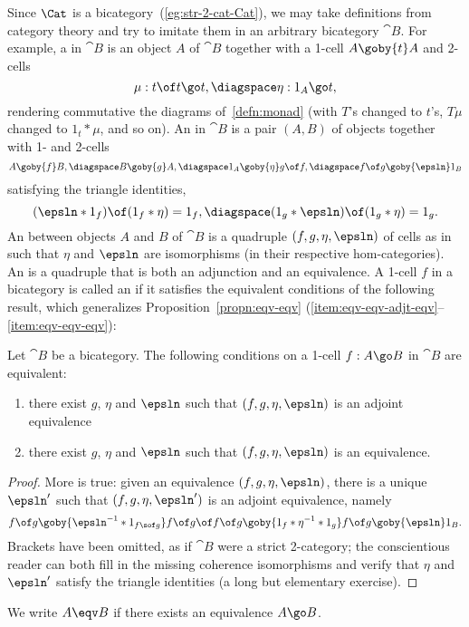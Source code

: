 Since $\Cat$ is a bicategory~(\ref{eg:str-2-cat-Cat}), we may take
definitions from category theory and try to imitate them in an arbitrary
bicategory $\cat{B}$.  For example, a %
%
%
in $\cat{B}$ is an object $A$ of $\cat{B}$ together with a 1-cell $A
\goby{t} A$ and 2-cells
\[
\mu: t \of t \go t, 
\diagspace
\eta: 1_A \go t,
\]
rendering commutative the diagrams of~\ref{defn:monad} (with $T$'s changed
to $t$'s, $T\mu$ changed to $1_t * \mu$, and so on).  An
%
%
%
in $\cat{B}$ is a pair $(A, B)$ of objects together with 1- and 2-cells
% 
\begin{equation}	\label{eq:bicat-adjn-data}
A \goby{f} B,
\diagspace
B \goby{g} A,
\diagspace
1_A \goby{\eta} g \of f,
\diagspace
f\of g \goby{\epsln} 1_B
\end{equation}
% 
satisfying the triangle identities,%
%
%
\[
(\epsln * 1_f) \of (1_f * \eta) = 1_f,
\diagspace
(1_g * \epsln) \of (1_g * \eta) = 1_g.
\]%
%
%
%
An  between objects $A$ and $B$ of $\cat{B}$ is a
quadruple $(f, g, \eta, \epsln)$ of cells as in~
such that $\eta$ and $\epsln$ are isomorphisms (in their respective
hom-categories).  An %
%
%
is a quadruple that is
both an adjunction and an equivalence.  A 1-cell $f$ in a bicategory is
called an  if it satisfies the equivalent conditions of
the following result, which generalizes Proposition~\ref{propn:eqv-eqv}%
(\ref{item:eqv-eqv-adjt-eqv}--\ref{item:eqv-eqv-eqv}):
% 
\begin{propn}	
Let $\cat{B}$ be a bicategory.  The following conditions on a 1-cell $f: A
\go B$ in $\cat{B}$ are equivalent:
%
\begin{enumerate}
\item %
there exist $g$, $\eta$ and $\epsln$ such that $(f, g, \eta, \epsln)$ is an
adjoint equivalence 
\item %
there exist $g$, $\eta$ and $\epsln$ such that $(f, g, \eta, \epsln)$ is an
equivalence. 
\end{enumerate}
\end{propn}
%
\begin{proof}
More is true: given an equivalence $(f, g, \eta, \epsln)$, there is a
unique $\epsln'$ such that $(f, g, \eta, \epsln')$ is an adjoint
equivalence, namely
\[
f \of g
\goby{\epsln^{-1} * 1_{f\sof g}}
f \of g \of f \of g
\goby{1_f * \eta^{-1} * 1_g}
f \of g
\goby{\epsln}
1_B.
\]
Brackets have been omitted, as if $\cat{B}$ were a strict 2-category; the
conscientious reader can both fill in the missing coherence isomorphisms
and verify that $\eta$ and $\epsln'$ satisfy the triangle identities (a
long but elementary exercise).
\done
\end{proof}
% 
We write $A \eqv B$%
% 
% 
if there exists an equivalence $A \go B$.%
%
%

